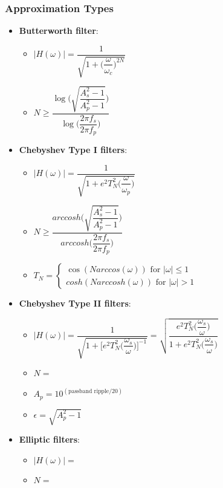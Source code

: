 \begin{multicols}{2}
\subsubsection{Approximation Types}
\begin{itemize}
    \item \textbf{Butterworth filter}:
    \begin{itemize}
	\item $|H(\omega)| = \dfrac{1}{\sqrt{1+\big(\dfrac{\omega}{\omega_c}\big)^{2N}}}$
	\item $N\geq \dfrac{\log\Big(\sqrt{\dfrac{A_s^2-1}{A_p^2-1}}\Big)}{\log\big(\dfrac{2\pi f_s}{2\pi f_p}\big)}$
    \end{itemize}
    \item \textbf{Chebyshev Type I filters}: %
    \begin{itemize}
	\item $|H(\omega)|=\dfrac{1}{\sqrt{1+e^2T_N^2\big(\dfrac{\omega}{\omega_p}\big)}}$
	\item $N\geq \dfrac{arccosh\Big(\sqrt{\dfrac{A_s^2-1}{A_p^2-1}}\Big)}{arccosh\big(\dfrac{2\pi f_s}{2\pi f_p}\big)}$
    \item $T_N=\left\{\begin{array}{ll}
        \cos(N arccos(\omega)) \text{ for } |\omega|\leq 1 \\
        cosh(N arccosh(\omega)) \text{ for } |\omega|> 1 
    \end{array}\right.$
    \end{itemize}
    \item \textbf{Chebyshev Type II filters}:
    \begin{itemize}
	\item $|H(\omega)|
    = \dfrac{1}{\sqrt{1+\big[e^2T_N^2\big(\dfrac{\omega_s}{\omega}\big)\big]^{-1}}} 
    = \sqrt{\dfrac{e^2T_N^2\big(\dfrac{\omega_s}{\omega}\big)}{1+e^2T_N^2\big(\dfrac{\omega_s}{\omega}\big)}}$
	\item $N = $
    \item $A_p = 10^{(\text{passband ripple}/20)}$
    \item $\epsilon = \sqrt{A_p^2-1}$
    \end{itemize}
    \item \textbf{Elliptic filters}:
    \begin{itemize}
	\item $|H(\omega)|=$
	\item $N=$
    \end{itemize}
\end{itemize}


\end{multicols}
